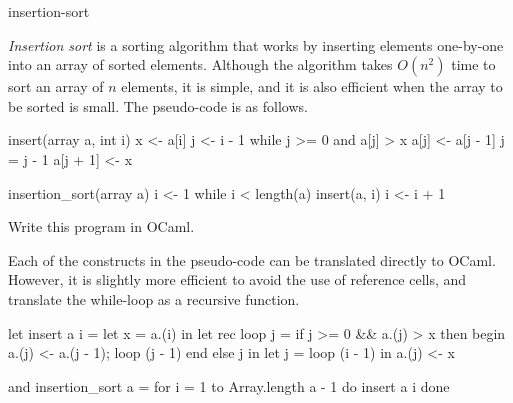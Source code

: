 %
\begin{exercise}{insertion-sort}

\emph{Insertion sort}
is a sorting algorithm that works by inserting elements one-by-one
into an array of sorted elements.  Although the algorithm takes
$O(n^2)$ time to sort an array of $n$ elements, it is simple, and it
is also efficient when the array to be sorted is small.  The
pseudo-code is as follows.

\begin{ccode}
insert(array a, int i)
    x <- a[i]
    j <- i - 1
    while j >= 0 and a[j] > x
        a[j] <- a[j - 1]
        j = j - 1
    a[j + 1] <- x

insertion_sort(array a)
    i <- 1
    while i < length(a)
        insert(a, i)
        i <- i + 1
\end{ccode}
%
Write this program in OCaml.

\begin{answer}\ifanswers
Each of the constructs in the pseudo-code can be translated directly to OCaml.  However, it is
slightly more efficient to avoid the use of reference cells, and translate the while-loop as a
recursive function.

\begin{ocaml}
let insert a i =
   let x = a.(i) in
   let rec loop j =
      if j >= 0 && a.(j) > x then begin
         a.(j) <- a.(j - 1);
         loop (j - 1)
      end
      else
         j
   in
   let j = loop (i - 1) in
   a.(j) <- x

and insertion_sort a =
   for i = 1 to Array.length a - 1 do
      insert a i
   done
\end{ocaml}
\fi\end{answer}
\end{exercise}

